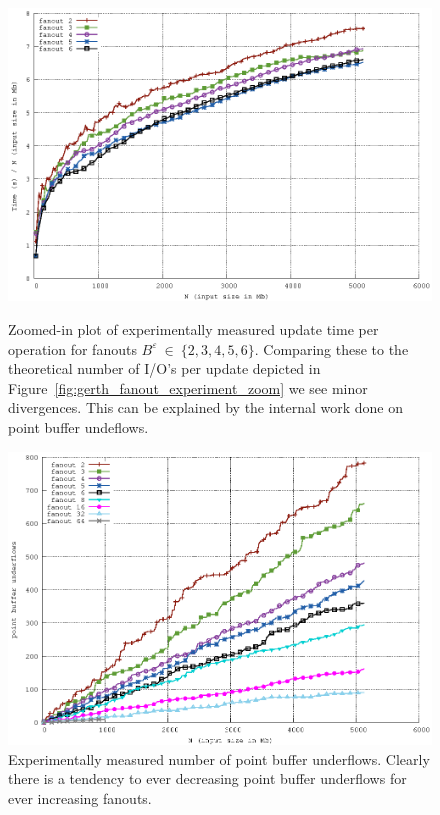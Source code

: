 \documentclass[twoside,11pt,openright]{report}
\def \epsilon {\varepsilon}
\begin{document}
\begin{figure}[]
\includegraphics[width=\textwidth]{../src/experiments/gerth_fanout_experiment_results/2016-05-06.11_52_24/time_zoomed}
\caption{Zoomed-in plot of experimentally measured update time per operation for fanouts $B^\epsilon~\in~\{2,3,4,5,6\}$. Comparing these to the theoretical number of I/O's per update depicted in Figure~\ref{fig:gerth_fanout_experiment_zoom} we see minor divergences. This can be explained by the internal work done on point buffer undeflows.}
\label{fig:gerth_fanout_experiment_time_zoomed}
\includegraphics[width=\textwidth]{../src/experiments/gerth_fanout_experiment_results/2016-05-06.11_52_24/pbu}
\caption{Experimentally measured number of point buffer underflows. Clearly there is a tendency to ever decreasing point buffer underflows for ever increasing fanouts.}
\label{fig:gerth_fanout_experiment_pbu}
\end{figure}
\end{document}
